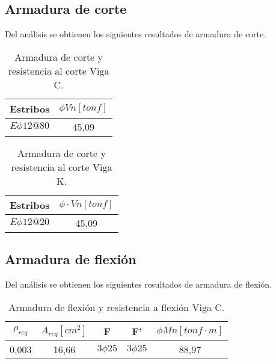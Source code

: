     \subsection{Armadura de corte}
    
        Del análisis se obtienen los siguientes resultados de armadura de corte.
            
        \begin{table}[H]
          \centering
          \caption{Armadura de corte y resistencia al corte Viga C.}
            \begin{tabular}{cc}
            \hline
            \textbf{Estribos} & \boldmath{}\textbf{$\phi Vn [tonf]$}\unboldmath{} \bigstrut\\
            \hline
            $E \phi 12 @ 80$ & 45,09 \bigstrut\\
            \hline
            \end{tabular}%
          \label{arm.corte.c}%
        \end{table}%
        
        \begin{table}[H]
          \centering
          \caption{Armadura de corte y resistencia al corte Viga K.}
            \begin{tabular}{cc}
            \hline
            \textbf{Estribos} & \boldmath{}\textbf{$\phi \cdot Vn [tonf]$}\unboldmath{} \bigstrut\\
            \hline
            $E \phi 12 @ 20$ & 45,09 \bigstrut\\
            \hline
            \end{tabular}%
          \label{arm.corte.k}%
        \end{table}%
        
        
    
    \subsection{Armadura de flexión}
    
        Del análisis se obtienen los siguientes resultados de armadura de flexión.
        
        \begin{table}[H]
          \centering
          \caption{Armadura de flexión y resistencia a flexión Viga C.}
            \begin{tabular}{ccccc}
            \hline
            \boldmath{}\textbf{$\rho_{req}$}\unboldmath{} & \boldmath{}\textbf{$A_{req} [cm^2]$}\unboldmath{} & \textbf{F} & \textbf{F'} & \boldmath{}\textbf{$\phi Mn [tonf \cdot m]$}\unboldmath{} \bigstrut\\
            \hline
            0,003 & 16,66 & $3 \phi 25$ & $3 \phi 25$ & 88,97 \bigstrut\\
            \hline
            \end{tabular}%
          \label{arm.flexion.c}%
    \end{table}%
    
